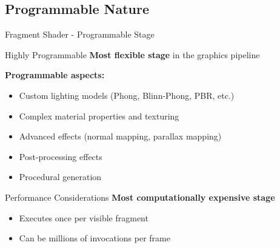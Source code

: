 \subsection{Programmable Nature}
\begin{frame}{Fragment Shader - Programmable Stage}
  \small
  \begin{conceptbox}{Highly Programmable}
    \textbf{Most flexible stage} in the graphics pipeline

    \vspace{0.3cm}
    \textbf{Programmable aspects:}
    \begin{itemize}
      \item Custom lighting models (Phong, Blinn-Phong, PBR, etc.)
      \item Complex material properties and texturing
      \item Advanced effects (normal mapping, parallax mapping)
      \item Post-processing effects
      \item Procedural generation
    \end{itemize}
  \end{conceptbox}
  \pause
  \begin{mathbox}{Performance Considerations}
    \textbf{Most computationally expensive stage}
    \begin{itemize}
      \item Executes once per visible fragment
      \item Can be millions of invocations per frame
    \end{itemize}
  \end{mathbox}
\end{frame}
